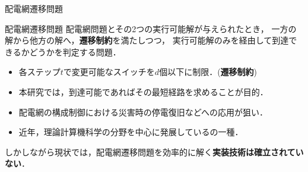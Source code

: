\documentclass[dvipdfmx,11pt]{beamer}
\begin{document}
\begin{frame}{配電網遷移問題}
 \begin{alertblock}{配電網遷移問題}
  配電網問題とその2つの実行可能解が与えられたとき，
  一方の解から他方の解へ，\alert{\bf 遷移制約}を満たしつつ，
  実行可能解のみを経由して到達できるかどうかを判定する問題．
  \begin{itemize}
  \item 各ステップ$t$で変更可能なスイッチを$d$個以下に制限．(\textbf{遷移制約})
  \item 本研究では，到達可能であればその最短経路を求めることが目的．
  \end{itemize}
 \end{alertblock}
 \begin{itemize}
  \item 配電網の構成制御における災害時の停電復旧などへの応用が狙い．
  \item 近年，理論計算機科学の分野を中心に発展しているの一種．
 \end{itemize}
 \begin{alertblock}{}
  しかしながら現状では，配電網遷移問題を効率的に解く\alert{\bf 実装技術は確立されていない}．
 \end{alertblock}
\end{frame}
\end{document}
